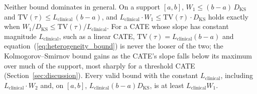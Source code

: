 \documentclass[AMA,Times1COL]{WileyNJDv5}
\begin{document}
Neither bound dominates in general. On a support $[a, b]$, $W_1 \leq (b - a)\,D_{\text{KS}}$ and $\mathrm{TV}(\tau) \leq L_{\text{clinical}}\,(b - a)$, and $L_{\text{clinical}} \cdot W_1 \leq \mathrm{TV}(\tau) \cdot D_{\text{KS}}$ holds exactly when $W_1 / D_{\text{KS}} \leq \mathrm{TV}(\tau) / L_{\text{clinical}}$. For a CATE whose slope has constant magnitude $L_{\text{clinical}}$, such as a linear CATE, $\mathrm{TV}(\tau) = L_{\text{clinical}}(b - a)$ and equation~(\ref{eq:heterogeneity_bound}) is never the looser of the two; the Kolmogorov--Smirnov bound gains as the CATE's slope falls below its maximum over much of the support, most sharply for a threshold CATE (Section~\ref{sec:discussion}). Every valid bound with the constant $L_{\text{clinical}}$, including $L_{\text{clinical}} \cdot W_2$ and, on $[a, b]$, $L_{\text{clinical}} (b - a) D_{\text{KS}}$, is at least $L_{\text{clinical}} W_1$.%
\end{document}
